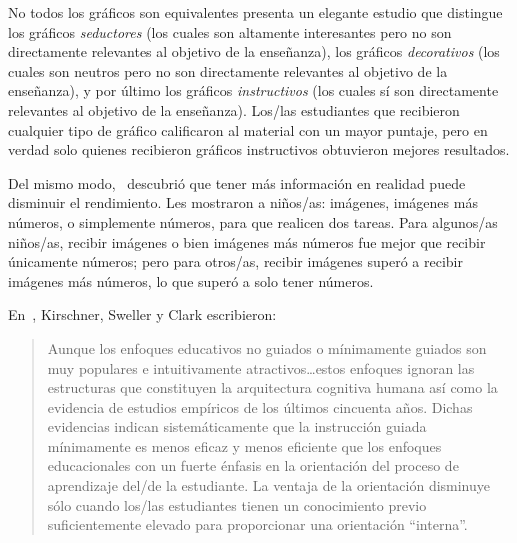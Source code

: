 \begin{aside}{No todos los gráficos son equivalentes}
  \cite{Sung2012} presenta un elegante estudio que distingue los gráficos \emph{seductores}
  (los cuales son altamente interesantes pero no son directamente relevantes al objetivo de la enseñanza),
  los gráficos \emph{decorativos}
  (los cuales son neutros pero no son directamente relevantes al objetivo de la enseñanza),
  y por último
  los gráficos \emph{instructivos}
  (los cuales sí son directamente relevantes al objetivo de la enseñanza).
  Los/las estudiantes que recibieron cualquier tipo de gráfico calificaron al material
  con un mayor puntaje, pero en verdad solo quienes recibieron gráficos instructivos
  obtuvieron mejores resultados.
  
  Del mismo modo,~\cite{Stam2013,Stam2014} descubrió que
  tener más información en realidad puede disminuir el rendimiento.
  Les mostraron a niños/as: imágenes, imágenes más números, o simplemente números,
  para que realicen dos tareas. 
  Para algunos/as niños/as, recibir imágenes o bien imágenes más números fue mejor que recibir únicamente números;
  pero para otros/as, recibir imágenes superó a recibir imágenes más números,
  lo que superó a solo tener números.
\end{aside}


En~\cite{Kirs2006}, Kirschner, Sweller y Clark escribieron:

\begin{quote}
 
  Aunque los enfoques educativos no guiados o mínimamente guiados son muy    
  populares e intuitivamente atractivos{\ldots}estos enfoques ignoran 
  las estructuras que constituyen la arquitectura cognitiva humana así como
  la evidencia de estudios empíricos de los últimos cincuenta años. Dichas evidencias
  indican sistemáticamente que la instrucción guiada mínimamente es menos eficaz y
  menos eficiente que los enfoques educacionales con un fuerte énfasis
  en la orientación del proceso de aprendizaje del/de la estudiante.
  La ventaja de la orientación disminuye sólo cuando los/las estudiantes
  tienen un conocimiento previo suficientemente elevado para proporcionar una orientación ``interna''.
\end{quote}


